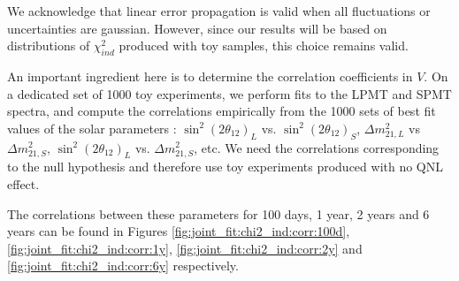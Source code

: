 \documentclass[../main.tex]{subfiles}
\begin{document}
We acknowledge that linear error propagation is valid when all fluctuations or uncertainties are gaussian. However, since our results will be based on distributions of $\chi^2_{ind}$ produced with toy samples, this choice remains valid.


An important ingredient here is to determine the correlation coefficients in $V$. On a dedicated set of 1000 toy experiments, we perform fits to the LPMT and SPMT spectra, and compute the correlations empirically from the 1000 sets of best fit values of the solar parameters :  $\sin^2(2\theta_{12})_{L}$ vs. $\sin^2(2\theta_{12})_{S}$, $\Delta m^2_{21,L}$ vs $\Delta m^2_{21,S}$, $\sin^2(2\theta_{12})_{L}$ vs. $\Delta m^2_{21,S}$, etc. We need the correlations corresponding to the null hypothesis and therefore use toy experiments produced with no QNL effect.

The correlations between these parameters for 100 days, 1 year, 2 years and 6 years can be found in Figures \ref{fig:joint_fit:chi2_ind:corr:100d}, \ref{fig:joint_fit:chi2_ind:corr:1y}, \ref{fig:joint_fit:chi2_ind:corr:2y} and \ref{fig:joint_fit:chi2_ind:corr:6y} respectively.
\end{document}
